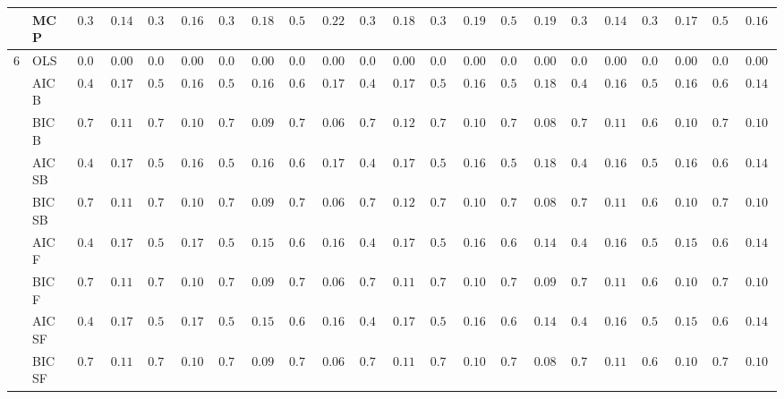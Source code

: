 \begin{tabular}{ll|ll|llllll|llllll|llllll}
 & MCP  & $0.360$ & $0.1449$ & $0.352$ & $0.1636$ & $0.356$ & $0.1898$ & $0.556$ & $0.2231$ & $0.302$ & $0.1875$ & $0.358$ & $0.1996$ & $0.510$ & $0.1915$ & $0.340$ & $0.1435$ & $0.362$ & $0.1722$ & $0.534$ & $0.1659$ \\\hline
6 & OLS  & $0.000$ & $0.0000$ & $0.000$ & $0.0000$ & $0.000$ & $0.0000$ & $0.000$ & $0.0000$ & $0.000$ & $0.0000$ & $0.000$ & $0.0000$ & $0.000$ & $0.0000$ & $0.000$ & $0.0000$ & $0.000$ & $0.0000$ & $0.000$ & $0.0000$ \\
 & AIC B  & $0.478$ & $0.1727$ & $0.516$ & $0.1686$ & $0.542$ & $0.1640$ & $0.640$ & $0.1752$ & $0.492$ & $0.1739$ & $0.526$ & $0.1649$ & $0.586$ & $0.1870$ & $0.476$ & $0.1628$ & $0.508$ & $0.1619$ & $0.624$ & $0.1485$ \\
 & BIC B  & $0.700$ & $0.1189$ & $0.712$ & $0.1076$ & $0.730$ & $0.0959$ & $0.776$ & $0.0653$ & $0.710$ & $0.1219$ & $0.724$ & $0.1093$ & $0.756$ & $0.0880$ & $0.712$ & $0.1148$ & $0.682$ & $0.1029$ & $0.710$ & $0.1040$ \\
 & AIC SB  & $0.478$ & $0.1727$ & $0.516$ & $0.1686$ & $0.542$ & $0.1640$ & $0.640$ & $0.1752$ & $0.492$ & $0.1739$ & $0.526$ & $0.1649$ & $0.586$ & $0.1870$ & $0.476$ & $0.1628$ & $0.508$ & $0.1619$ & $0.624$ & $0.1485$ \\
 & BIC SB  & $0.700$ & $0.1189$ & $0.712$ & $0.1076$ & $0.730$ & $0.0959$ & $0.776$ & $0.0653$ & $0.710$ & $0.1219$ & $0.724$ & $0.1093$ & $0.756$ & $0.0880$ & $0.712$ & $0.1148$ & $0.682$ & $0.1029$ & $0.710$ & $0.1040$ \\
 & AIC F  & $0.480$ & $0.1729$ & $0.520$ & $0.1729$ & $0.558$ & $0.1590$ & $0.676$ & $0.1603$ & $0.498$ & $0.1764$ & $0.542$ & $0.1689$ & $0.656$ & $0.1479$ & $0.476$ & $0.1628$ & $0.522$ & $0.1554$ & $0.648$ & $0.1453$ \\
 & BIC F  & $0.702$ & $0.1155$ & $0.712$ & $0.1076$ & $0.732$ & $0.0952$ & $0.776$ & $0.0653$ & $0.712$ & $0.1183$ & $0.726$ & $0.1088$ & $0.756$ & $0.0925$ & $0.712$ & $0.1148$ & $0.690$ & $0.1040$ & $0.712$ & $0.1037$ \\
 & AIC SF  & $0.480$ & $0.1729$ & $0.520$ & $0.1729$ & $0.558$ & $0.1590$ & $0.676$ & $0.1603$ & $0.498$ & $0.1764$ & $0.544$ & $0.1635$ & $0.658$ & $0.1430$ & $0.476$ & $0.1628$ & $0.522$ & $0.1554$ & $0.648$ & $0.1453$ \\
 & BIC SF  & $0.702$ & $0.1155$ & $0.712$ & $0.1076$ & $0.732$ & $0.0952$ & $0.776$ & $0.0653$ & $0.712$ & $0.1183$ & $0.726$ & $0.1088$ & $0.760$ & $0.0853$ & $0.712$ & $0.1148$ & $0.690$ & $0.1040$ & $0.712$ & $0.1037$ \\

\end{tabular}
